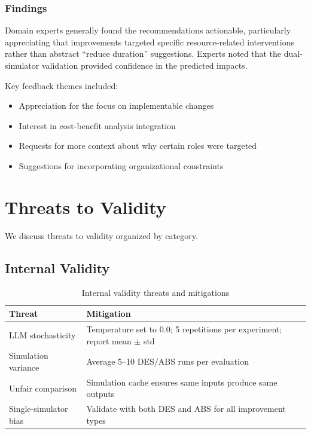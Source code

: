 \documentclass[preprint,12pt]{elsarticle}
\begin{document}
\subsubsection{Findings}


Domain experts generally found the recommendations actionable, particularly appreciating that improvements targeted specific resource-related interventions rather than abstract ``reduce duration'' suggestions. Experts noted that the dual-simulator validation provided confidence in the predicted impacts.

Key feedback themes included:
\begin{itemize}
    \item Appreciation for the focus on implementable changes
    \item Interest in cost-benefit analysis integration
    \item Requests for more context about why certain roles were targeted
    \item Suggestions for incorporating organizational constraints
\end{itemize}

\section{Threats to Validity}
\label{sec:threats}

We discuss threats to validity organized by category.

\subsection{Internal Validity}

\begin{table}[htbp]
\centering
\caption{Internal validity threats and mitigations}
\label{tab:internal}
\begin{tabular}{@{}p{4cm}p{8cm}@{}}
\toprule
\textbf{Threat} & \textbf{Mitigation} \\
\midrule
LLM stochasticity & Temperature set to 0.0; 5 repetitions per experiment; report mean $\pm$ std \\
Simulation variance & Average 5--10 DES/ABS runs per evaluation \\
Unfair comparison & Simulation cache ensures same inputs produce same outputs \\
Single-simulator bias & Validate with both DES and ABS for all improvement types \\
\bottomrule
\end{tabular}
\end{table}
\end{document}
